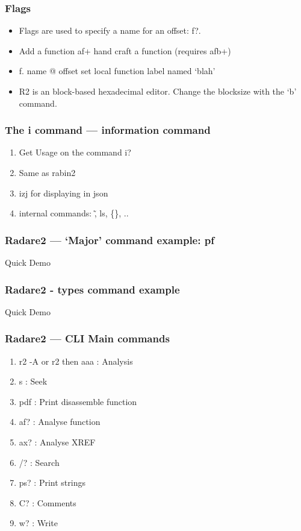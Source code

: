 \documentclass[10pt,pdf,utf8,english,compress,hyperref={unicode}]{beamer}
\begin{document}
\begin{frame}[fragile]
  \frametitle{Flags}
  \begin{itemize}
  \item Flags are used to specify a name for an offset: \alert{f?}.
  \item Add a function af+ hand craft a function (requires afb+)
	\item f. name @ offset set local function label named `blah'
 \end{itemize}
 \noindent\makebox[\linewidth]{\rule{\paperwidth}{0.4pt}}
 \begin{itemize}
 \item R2 is an block-based hexadecimal editor. Change the blocksize with the ‘b’ command.
\end{itemize}
\end{frame}

\begin{frame}[fragile]
  \frametitle{The i command — information command}
  \begin{enumerate}
  \item Get Usage on the command \alert{i?}
  \item Same as \alert{rabin2}
  \item izj for displaying in json
  \item internal commands: \~, ls, \{\}, ..
 \end{enumerate}
\end{frame}


\begin{frame}[fragile]
  \frametitle{Radare2 — `Major' command example: pf}
  Quick Demo
\end{frame}

\begin{frame}[fragile]
  \frametitle{Radare2 - types command example}
  Quick Demo
\end{frame}

\begin{frame}[fragile]
  \frametitle{Radare2 — CLI Main commands}
  \begin{enumerate}
   \item r2 -A or r2 then aaa : Analysis
   \item s : Seek
   \item pdf : Print disassemble function
   \item af? : Analyse function
   \item ax? : Analyse XREF
   \item /? : Search
   \item ps? : Print strings
   \item C? : Comments
   \item w? : Write
 \end{enumerate}
\end{frame}
\end{document}
